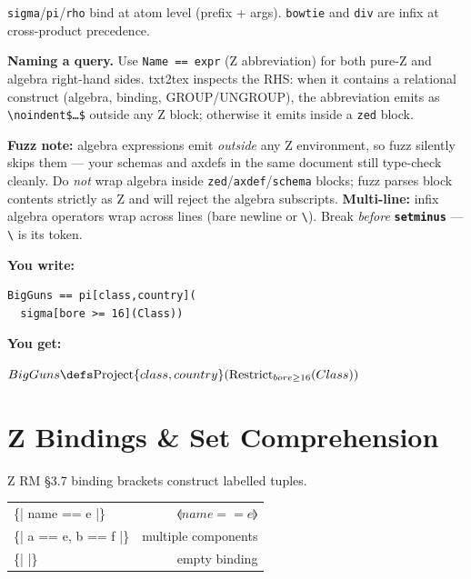 \documentclass[10pt,landscape,a4paper]{article}
\newcommand{\kw}[1]{\texttt{\bfseries #1}}
\newenvironment{exwrite}%
  {\par\noindent\scriptsize\textbf{You write:}\par\vspace{0pt}\scriptsize}%
  {\vspace{1pt}}
\newenvironment{exget}%
  {\par\noindent\scriptsize\textbf{You get:}\par\vspace{0pt}\small}%
  {\par\vspace{3pt}}
\begin{document}
\begin{multicols}{3}
\smallskip
{\footnotesize \texttt{sigma}/\texttt{pi}/\texttt{rho} bind at atom level (prefix + args). \texttt{bowtie} and \texttt{div} are infix at cross-product precedence.}

\smallskip
{\scriptsize\textbf{Naming a query.} Use \texttt{Name == expr} (Z abbreviation) for both pure-Z and algebra right-hand sides. txt2tex inspects the RHS: when it contains a relational construct (algebra, binding, GROUP/UNGROUP), the abbreviation emits as \texttt{\textbackslash noindent\$\ldots\$} outside any Z block; otherwise it emits inside a \texttt{zed} block.}

\smallskip
{\scriptsize\textbf{Fuzz note:} algebra expressions emit \emph{outside} any Z environment, so fuzz silently skips them — your schemas and axdefs in the same document still type-check cleanly. Do \emph{not} wrap algebra inside \texttt{zed}/\texttt{axdef}/\texttt{schema} blocks; fuzz parses block contents strictly as Z and will reject the algebra subscripts. \textbf{Multi-line:} infix algebra operators wrap across lines (bare newline or \texttt{\textbackslash}). Break \emph{before} \kw{setminus} — \texttt{\textbackslash} is its token.}
\begin{exwrite}
\begin{verbatim}
BigGuns == pi[class,country](
  sigma[bore >= 16](Class))
\end{verbatim}
\end{exwrite}
\begin{exget}
\begin{center}
\noindent$BigGuns \defs \mathrm{Project}\{class,country\}(\mathrm{Restrict}_{bore \geq 16}(Class))$
\end{center}
\end{exget}

\section{Z Bindings \& Set Comprehension}

{\scriptsize Z RM §3.7 binding brackets construct labelled tuples.}

\begin{tabularx}{\columnwidth}{LR}
\{| name == e |\}    & $\lblot name == e \rblot$ \\
\{| a == e, b == f |\} & multiple components \\
\{| |\}              & empty binding \\
\end{tabularx}


\end{multicols}
\end{document}
